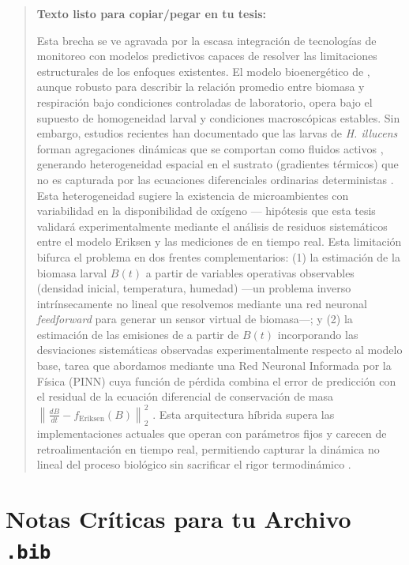 \documentclass[12pt,oneside]{book}
\begin{document}
\begin{quote}
\textbf{Texto listo para copiar/pegar en tu tesis:}

Esta brecha se ve agravada por la escasa integración de tecnologías de monitoreo con modelos predictivos capaces de resolver las limitaciones estructurales de los enfoques existentes. El modelo bioenergético de \textcite{eriksen2022growth}, aunque robusto para describir la relación promedio entre biomasa y respiración bajo condiciones controladas de laboratorio, opera bajo el supuesto de homogeneidad larval y condiciones macroscópicas estables. Sin embargo, estudios recientes han documentado que las larvas de \textit{H. illucens} forman agregaciones dinámicas que se comportan como fluidos activos \parencite{ko2021air}, generando heterogeneidad espacial en el sustrato (gradientes térmicos) que no es capturada por las ecuaciones diferenciales ordinarias deterministas \parencite{tomberlin2025bugbook}. Esta heterogeneidad sugiere la existencia de microambientes con variabilidad en la disponibilidad de oxígeno --- hipótesis que esta tesis validará experimentalmente mediante el análisis de residuos sistemáticos entre el modelo Eriksen y las mediciones de  en tiempo real. Esta limitación bifurca el problema en dos frentes complementarios: (1) la estimación de la biomasa larval $B(t)$ a partir de variables operativas observables (densidad inicial, temperatura, humedad) ---un problema inverso intrínsecamente no lineal que resolvemos mediante una red neuronal \textit{feedforward} para generar un sensor virtual de biomasa---; y (2) la estimación de las emisiones de  a partir de $B(t)$ incorporando las desviaciones sistemáticas observadas experimentalmente respecto al modelo base, tarea que abordamos mediante una Red Neuronal Informada por la Física (PINN) cuya función de pérdida combina el error de predicción con el residual de la ecuación diferencial de conservación de masa $\left\| \frac{dB}{dt} - f_{\text{Eriksen}}(B) \right\|_2^2$ \parencite{raissi2019physics}. Esta arquitectura híbrida supera las implementaciones actuales que operan con parámetros fijos y carecen de retroalimentación en tiempo real, permitiendo capturar la dinámica no lineal del proceso biológico sin sacrificar el rigor termodinámico \parencite{kamilaris2017review,liuOptimizingDataPipelines2023}.
\end{quote}

\section{Notas Críticas para tu Archivo \texttt{.bib}}
\end{document}
